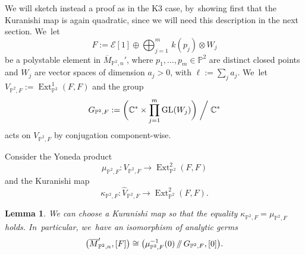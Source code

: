 \documentclass[11pt]{article}
\providecommand\sslash{\mathop{/\mkern-5.5mu/}}
\newcommand{\CC}{{\mathbb C}}\let\C\CC
\newcommand{\PP}{{\mathbb P}}\let\P\PP
\newcommand\cE{\mathcal{E}}
\DeclareMathOperator{\Ext}{Ext}
\DeclareMathOperator{\GL}{GL}
\newtheorem{lemm}{Lemma}[section]
\theoremstyle{definition}
\begin{document}
We will sketch instead a proof as in the K3 case, by~showing first that the Kuranishi map is again quadratic, since we will need this description in the next section. We~let
\[
F:=\cE[1]\oplus \bigoplus_{j=1}^m\, k(p_j)\otimes W_j
\]
be a polystable element in $\overline{M}_{\PP^2,n}'$, where $p_1,\dots,p_m\in \PP^2$ are distinct closed points and $W_j$ are vector spaces of dimension $a_j>0$, with $\ell:=\sum_j a_j$. We~let $V_{\PP^2,F}:=\Ext^1_{\PP^2}(F,F)$ and the group
\begin{equation}\label{eq:groupP^2}
G_{\PP^2,F}:=\biggl(\CC^*\times \prod_{j=1}^m\GL(W_j)\biggr)\biggm/\CC^*
\end{equation}
acts on $V_{\PP^2,F}$ by conjugation component-wise.

Consider the Yoneda product
\[
\mu_{\PP^2,F}\colon V_{\PP^2,F} \to \Ext^2_{\PP^2}(F,F)
\]
and the Kuranishi map
\[
\kappa_{\PP^2,F}\colon \widehat{V}_{\PP^2,F} \to \Ext^2_{\PP^2}(F,F).
\]

\begin{lemm}\label{lem:KuranishiP2}
We can choose a Kuranishi map so that the equality $\kappa_{\PP^2,F}=\mu_{\PP^2,F}$ holds. In~particular, we~have an isomorphism of analytic germs
\[
\bigl(\overline{M}_{\PP^2,n}',[F]\bigr)\cong \bigl(\mu_{\PP^2,F}^{-1}(0)\sslash G_{\PP^2,F},[0]\bigr).
\]
\end{lemm}
\end{document}
